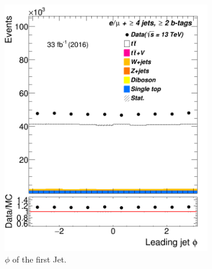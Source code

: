 \begin{figure}
\begin{subfigure}{0.25\textwidth}
	\includegraphics[width=\linewidth]{ControlPlots_emujets_2016_4incl_2incl/jet0_phi_emujets_2016.png}
	\caption{$\phi$ of the first Jet.} \label{fig:f2}
\end{subfigure}\hspace*{1.0cm}
\begin{subfigure}{0.25\textwidth}

\end{subfigure}
\end{figure}
